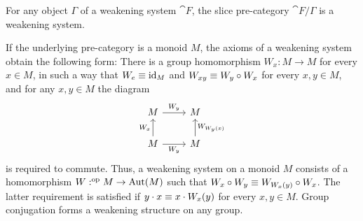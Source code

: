 \begin{cor}
For any object $\Gamma$ of a weakening system $\cat{F}$, the slice pre-category
$\cat{F}/\Gamma$ is a weakening system.
\end{cor}

\begin{eg}
If the underlying pre-category is a monoid $M$, the axioms of a weakening system
obtain the following form: There is a group homomorphism $W_x:M\to M$ for
every $x\in M$, in such a way that $W_e\equiv {\mathrm{id}_{M}}$ and $W_{xy}\equiv W_y\circ W_x$
for every $x,y\in M$, and for any $x,y\in M$ the diagram
\begin{equation*}
\begin{tikzcd}
M \arrow[r,"W_y"]
  &
M 
  \\
M \arrow[u,"W_x"]
  \arrow[r,swap,"W_y"]
  &
M \arrow[u,swap,"W_{W_y(x)}"]
\end{tikzcd}
\end{equation*}
is required to commute. Thus, a weakening system on a monoid $M$ consists of
a homomorphism $W:^{\mathrm{op}} M\to\mathrm{Aut}(M)$ such that $W_x\circ W_y\equiv 
W_{W_x(y)}\circ W_x$. The latter requirement is satisfied if $y\cdot x\equiv x\cdot W_x(y)$
for every $x,y\in M$. Group conjugation forms a weakening structure on any group.
\end{eg}

\begin{comment}
\begin{lem}
For any group, conjugation is a weakening structure. Thus, any group is
canonically a weakening system.
\end{lem}

\begin{proof}
Note that $e^{-1}xe\jdeq x$ and $(xy)^{-1}z(xy)\jdeq y^{-1}(x^{-1}zx)y$ for any $x,y,z\in G$.
Also, the diagram
\begin{equation*}
\begin{tikzcd}
G \arrow[r,"\mathrm{conj}_y"]
  &
G 
  \\
G \arrow[u,"\mathrm{conj}_x"]
  \arrow[r,swap,"\mathrm{conj}_y"]
  &
G \arrow[u,swap,"\mathrm{conj}_{y^{-1}xy}"]
\end{tikzcd}
\end{equation*}
commutes.
\end{proof}
\end{comment}

\begin{comment}
\begin{rmk}
Similarly, every groupoid has a canonical weakening structure given by
conjugation.
\end{rmk}
\end{comment}

